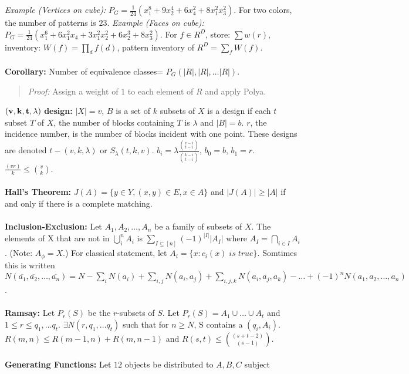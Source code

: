 \emph{Example (Vertices on cube):}
$P_G= {\frac {1} {24}}
(x_{1}^{8}+ 9x_{2}^4+ 6x_{4}^{2} + 8x_{1}^{2} x_{3}^2)$.  For two colors,
the number of patterns is $23$.
\emph{Example (Faces on cube):}
$P_G= {\frac {1} {24}}
(x_{1}^{6}+ 6x_{1}^{2}x_{4}+ 3x_{1}^{2}x_{2}^2 + 6x_{2}^{3} + 8x_{3}^{2})$.
For $f \in R^{D}$, store: $\sum w(r)$, inventory: $W(f)= \prod_{d} f(d)$,
pattern inventory of $R^{D}= \sum_{f} W(f)$.
\\
\\
{\bf Corollary:}
Number of equivalence classes= $P_{G}(|R|,|R|, \ldots |R|)$.
\begin{quote}
\emph{Proof:}
Assign a weight of $1$ to each element of $R$ and apply Polya.
\end{quote}
${\bf (v, k, t, \lambda )}$ {\bf design:}
$|X|= v$, $B$ is a set of $k$ subsets of
$X$ is a design if each $t$ subset $T$ of $X$,
the number of blocks containing $T$ is
$\lambda$ and $|B|=b$.
$r$, the incidence number, is the number of blocks incident
with one point.  These designs are denoted $t-(v,k, \lambda )$ or
$S_{\lambda}(t, k, v)$.
$b_i = \lambda
{\frac
{{{v-i} \choose {t-i}}}
{{{k-i} \choose {t-i}}}
}$,
$b_0 =b$,
$b_1 = r$.
${\frac {(vr)} {k}} \leq {{v} \choose {k}}$.
\\
\\
{\bf Hall's Theorem:} $J(A)= \{ y \in Y, (x,y) \in E, x \in A \}$
and $|J(A)| \geq |A|$ if and only if there is a complete matching.
\\
\\
{\bf Inclusion-Exclusion:}  Let $A_1 , A_2 , \ldots , A_n$ be a family of 
subsets of $X$.  The elements
of X that are not in $\bigcup_i^n A_i$ is
$\sum_{I \subseteq [n]} (-1)^{| I | } |A_I |$ where
$A_I = \bigcap_{i \in I} A_i$. (Note:
$A_{\phi}= X$.)  For classical statement, let $A_i = \{ x: c_i (x)
\; is \; true\}$.  Somtimes this is written
$N({\overline {a_1}}, {\overline {a_2}}, \ldots ,{\overline {a_n}})= N - \sum_i N(a_i) + \sum_{i,j} N(a_i , a_j) + \sum_{i,j,k} N(a_i , a_j , a_k) - 
\ldots +(-1)^n N(a_1, a_2,\ldots, a_n)$.
\\
\\
{\bf Ramsay:} Let $P_{r}(S)$ be the $r$-subsets of $S$.
Let $P_{r}(S)= A_{1} \cup \ldots \cup A_{t}$ and $1 \leq r \leq q_{1},\ldots
q_{t}$.
$\exists N(r, q_{1},\ldots q_{t})$ such that for $n \geq N$, S contains a
$(q_{i},A_{i})$.
$R(m,n) \leq R(m-1, n) + R(m, n-1)$ and $R(s,t) \leq {(s+t-2) \choose
(s-1)}$.
\\
\\
{\bf Generating Functions:} Let $12$ objects be distributed to $A, B, C$ subject
